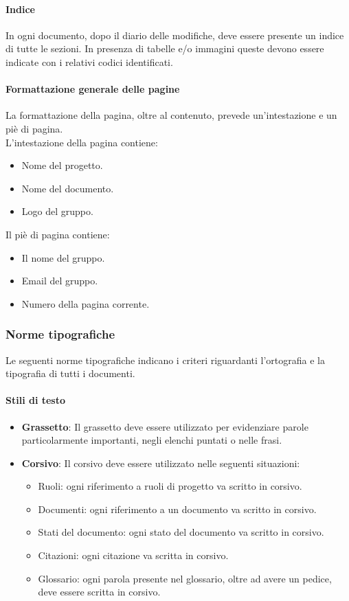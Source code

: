 \paragraph{Indice}
In ogni documento, dopo il diario delle modifiche, deve essere presente un
indice di tutte le sezioni. In presenza di tabelle e/o immagini queste devono
essere indicate con i relativi codici identificati.

\paragraph{Formattazione generale delle pagine}
La formattazione della pagina, oltre al contenuto, prevede un'intestazione e un
piè di pagina. \\
L'intestazione della pagina contiene:
\begin{itemize}
  \item Nome del progetto.
  \item Nome del documento.
  \item Logo del gruppo.
\end{itemize}
Il piè di pagina contiene:
\begin{itemize}
  \item Il nome del gruppo.
  \item Email del gruppo.
  \item Numero della pagina corrente.
\end{itemize}

\subsubsection{Norme tipografiche}
Le seguenti norme tipografiche indicano i criteri riguardanti l'ortografia e la tipografia di tutti i documenti.

\paragraph{Stili di testo}
\begin{itemize}
  \item \textbf{Grassetto}: Il grassetto deve essere utilizzato per evidenziare parole
  particolarmente importanti, negli elenchi puntati o nelle frasi.
  \item \textbf{Corsivo}: Il corsivo deve essere utilizzato nelle seguenti
  situazioni:
  \begin{itemize}
    \item Ruoli: ogni riferimento a ruoli di progetto va scritto in corsivo.
    \item Documenti: ogni riferimento a un documento va scritto in corsivo.
    \item Stati del documento: ogni stato del documento va scritto in corsivo.
    \item Citazioni: ogni citazione va scritta in corsivo.
    \item Glossario: ogni parola presente nel glossario, oltre ad avere un pedice, deve
    essere scritta in corsivo.
  \end{itemize}
\end{itemize}

